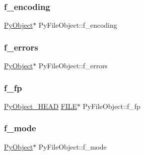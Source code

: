 \mbox{\label{struct_py_file_object_a3a55985a0d83e121bb284e0ea68adb45}} 
\subsubsection{\texorpdfstring{f\_encoding}{f\_encoding}}
{\footnotesize\ttfamily \mbox{\hyperlink{_python27_2object_8h_aadc84ac7aed2cfa6f20c25f62bf3dac7}{Py\+Object}}$\ast$ Py\+File\+Object\+::f\+\_\+encoding}

\mbox{\label{struct_py_file_object_a55403b6e96258499d8ca3060a9eedc56}} 
\subsubsection{\texorpdfstring{f\_errors}{f\_errors}}
{\footnotesize\ttfamily \mbox{\hyperlink{_python27_2object_8h_aadc84ac7aed2cfa6f20c25f62bf3dac7}{Py\+Object}}$\ast$ Py\+File\+Object\+::f\+\_\+errors}

\mbox{\label{struct_py_file_object_a02ca7b58e0cec7179aed1bc7facb859d}} 
\subsubsection{\texorpdfstring{f\_fp}{f\_fp}}
{\footnotesize\ttfamily \mbox{\hyperlink{_python27_2object_8h_a0bf35c1f3ea13f925de94d8593db3b7e}{Py\+Object\+\_\+\+H\+E\+AD}} \mbox{\hyperlink{fileobject_8h_ae8a16e073fe79a434049ae0c07f71fd3}{F\+I\+LE}}$\ast$ Py\+File\+Object\+::f\+\_\+fp}

\mbox{\label{struct_py_file_object_a536f2ba1896d8bbd6885b2f187036434}} 
\subsubsection{\texorpdfstring{f\_mode}{f\_mode}}
{\footnotesize\ttfamily \mbox{\hyperlink{_python27_2object_8h_aadc84ac7aed2cfa6f20c25f62bf3dac7}{Py\+Object}}$\ast$ Py\+File\+Object\+::f\+\_\+mode}

